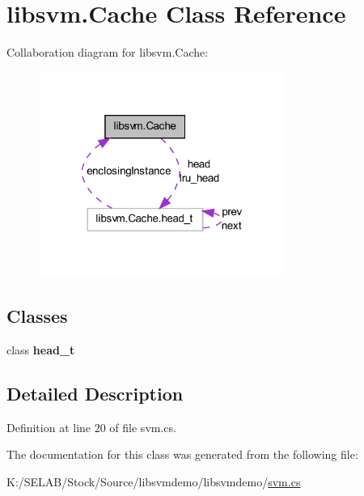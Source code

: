 \hypertarget{classlibsvm_1_1_cache}{
\section{libsvm.Cache Class Reference}
\label{classlibsvm_1_1_cache}
}


Collaboration diagram for libsvm.Cache:
\nopagebreak
\begin{figure}[H]
\begin{center}
\leavevmode
\includegraphics[width=228pt]{classlibsvm_1_1_cache__coll__graph}
\end{center}
\end{figure}
\subsection*{Classes}
\begin{DoxyCompactItemize}
\item 
class {\bfseries head\_\-t}
\end{DoxyCompactItemize}


\subsection{Detailed Description}


Definition at line 20 of file svm.cs.



The documentation for this class was generated from the following file:\begin{DoxyCompactItemize}
\item 
K:/SELAB/Stock/Source/libsvmdemo/libsvmdemo/\hyperlink{svm_8cs}{svm.cs}\end{DoxyCompactItemize}
